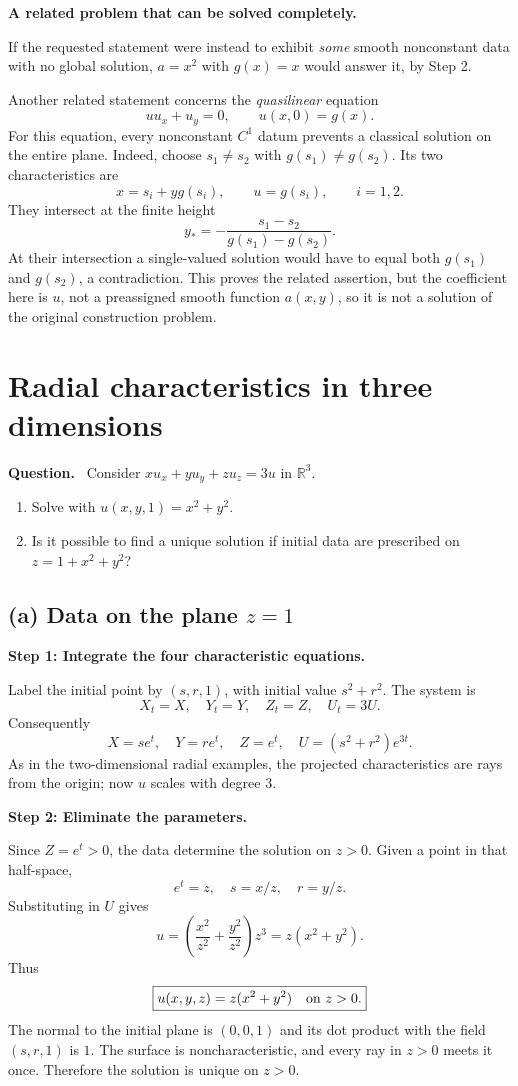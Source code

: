 \documentclass[11pt,a4paper]{article}
\newcommand{\R}{\mathbb R}
\newcommand{\step}[1]{\par\medskip\textbf{#1}\par}
\newenvironment{question}{\par\smallskip\begingroup\color{ink}\textbf{Question.}\ }{\par\endgroup\medskip}
\newcommand{\answer}[1]{\begin{equation*}\boxed{\displaystyle #1}\end{equation*}}
\newcommand{\problem}[1]{\clearpage\section{#1}}
\begin{document}
\step{A related problem that can be solved completely.}
If the requested statement were instead to exhibit \emph{some} smooth nonconstant data with no global solution, $a=x^2$ with $g(x)=x$ would answer it, by Step 2.

Another related statement concerns the \emph{quasilinear} equation
\[
 uu_x+u_y=0,\qquad u(x,0)=g(x).
\]
For this equation, every nonconstant $C^1$ datum prevents a classical solution on the entire plane. Indeed, choose $s_1\ne s_2$ with $g(s_1)\ne g(s_2)$. Its two characteristics are
\[
 x=s_i+y g(s_i),\qquad u=g(s_i),\qquad i=1,2.
\]
They intersect at the finite height
\[
 y_*=-\frac{s_1-s_2}{g(s_1)-g(s_2)}.
\]
At their intersection a single-valued solution would have to equal both $g(s_1)$ and $g(s_2)$, a contradiction. This proves the related assertion, but the coefficient here is $u$, not a preassigned smooth function $a(x,y)$, so it is not a solution of the original construction problem.

\problem{Radial characteristics in three dimensions}
\begin{question}
Consider $xu_x+yu_y+zu_z=3u$ in $\R^3$.
\begin{enumerate}[label=(\alph*)]
\item Solve with $u(x,y,1)=x^2+y^2$.
\item Is it possible to find a unique solution if initial data are prescribed on $z=1+x^2+y^2$?
\end{enumerate}
\end{question}
\subsection*{(a) Data on the plane $z=1$}
\step{Step 1: Integrate the four characteristic equations.}
Label the initial point by $(s,r,1)$, with initial value $s^2+r^2$. The system is
\[
 X_t=X,\quad Y_t=Y,\quad Z_t=Z,\quad U_t=3U.
\]
Consequently
\[
 X=se^t,\quad Y=re^t,\quad Z=e^t,\quad
 U=(s^2+r^2)e^{3t}.
\]
As in the two-dimensional radial examples, the projected characteristics are rays from the origin; now $u$ scales with degree $3$.

\step{Step 2: Eliminate the parameters.}
Since $Z=e^t>0$, the data determine the solution on $z>0$. Given a point in that half-space,
\[
 e^t=z,\quad s=x/z,\quad r=y/z.
\]
Substituting in $U$ gives
\[
 u=\left(\frac{x^2}{z^2}+\frac{y^2}{z^2}\right)z^3=z(x^2+y^2).
\]
Thus
\answer{u(x,y,z)=z(x^2+y^2)\quad\hbox{on }z>0.}
The normal to the initial plane is $(0,0,1)$ and its dot product with the field $(s,r,1)$ is $1$. The surface is noncharacteristic, and every ray in $z>0$ meets it once. Therefore the solution is unique on $z>0$.
\end{document}
